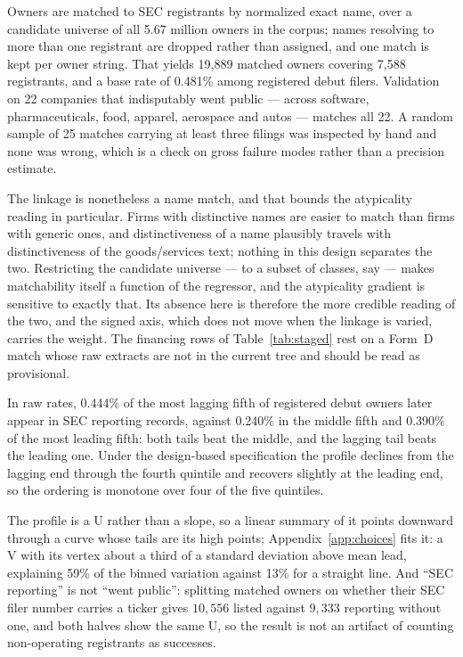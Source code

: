 \documentclass[11pt]{article}
\begin{document}
Owners are matched to SEC
registrants by normalized exact name, over a candidate universe of all
5.67 million owners in the corpus; names resolving to more than one
registrant are dropped rather than assigned, and one match is kept per owner
string. That yields 19{,}889 matched owners covering 7{,}588 registrants, and
a base rate of 0.481\% among registered debut filers. Validation on 22
companies that indisputably went public --- across software,
pharmaceuticals, food, apparel, aerospace and autos --- matches all 22. A random sample of 25 matches
carrying at least three filings was inspected by hand and none was wrong,
which is a check on gross failure modes rather than a precision estimate.

The linkage is nonetheless a name match, and that bounds the atypicality
reading in particular. Firms with distinctive names are easier to match than
firms with generic ones, and distinctiveness of a name plausibly travels with
distinctiveness of the goods/services text; nothing in this design separates
the two. Restricting the candidate universe --- to a subset of classes, say
--- makes matchability itself a function of the regressor, and the
atypicality gradient is sensitive to exactly that. Its absence here is
therefore the more credible reading of the two, and the signed axis, which
does not move when the linkage is varied, carries the weight. The financing
rows of Table~\ref{tab:staged} rest on a Form~D match whose raw extracts are
not in the current tree and should be read as provisional.

In raw rates, 0.444\% of the most
lagging fifth of registered debut owners later appear in SEC reporting
records, against 0.240\% in the middle fifth and 0.390\% of the most leading
fifth: both tails beat the middle, and the lagging tail beats the leading
one. Under the design-based specification the profile declines from the
lagging end through the fourth quintile and recovers slightly at the leading
end, so the ordering is monotone over four of the five quintiles.

The profile is a U rather than a slope, so a linear
summary of it points downward through a curve whose tails are its high
points; Appendix~\ref{app:choices} fits it: a V with its vertex about a
third of a standard deviation above mean lead, explaining 59\% of the binned
variation against 13\% for a straight line. And ``SEC reporting'' is
not ``went public'': splitting matched owners on whether their SEC filer number carries a
ticker gives $10{,}556$ listed against $9{,}333$ reporting without one, and
both halves show the same U, so the result is not an artifact of counting
non-operating registrants as successes.
\end{document}
